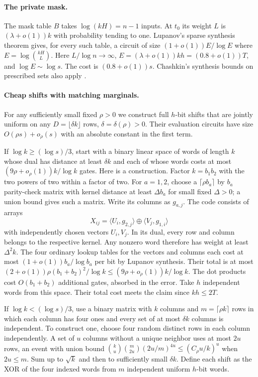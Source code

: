 \documentclass[11pt]{article}
\begin{document}
\paragraph{The private mask.}
The mask table $B$ takes $\log(kH)=n-1$ inputs. At $t_0$ its weight $L$ is $(\lambda+o(1))k$ with probability tending to one. Lupanov's sparse synthesis theorem \cite{lup,kors} gives, for every such table, a circuit of size $(1+o(1))E/\log E$ where $E=\log\binom{kH}{L}$. Here $L/\log n\to\infty$, $E=(\lambda+o(1))kh=(0.8+o(1))T$, and $\log E\sim\log s$. The cost is $(0.8+o(1))s$. Chashkin's synthesis bounds on prescribed sets also apply \cite{chash}.

\paragraph{Cheap shifts with matching marginals.}
For any sufficiently small fixed $\rho>0$ we construct full $h$-bit shifts that are jointly uniform on any $D=\lfloor\delta k\rfloor$ rows, $\delta=\delta(\rho)>0$. Their evaluation circuits have size $O(\rho s)+o_\rho(s)$ with an absolute constant in the first term.

If $\log k\ge (\log s)/3$, start with a binary linear space of words of length $k$ whose dual has distance at least $\delta k$ and each of whose words costs at most $(9\rho+o_\rho(1))k/\log k$ gates. Here is a construction. Factor $k=b_1 b_2$ with the two powers of two within a factor of two. For $a=1,2$, choose a $\lceil\rho b_a\rceil$ by $b_a$ parity-check matrix with kernel distance at least $\Delta b_a$ for small fixed $\Delta>0$; a union bound gives such a matrix. Write its columns as $g_{a,j}$. The code consists of arrays
\[
        X_{ij}=\langle U_i,g_{2,j}\rangle\oplus\langle V_j,g_{1,i}\rangle
\]
with independently chosen vectors $U_i,V_j$. In its dual, every row and column belongs to the respective kernel. Any nonzero word therefore has weight at least $\Delta^2 k$. The four ordinary lookup tables for the vectors and columns each cost at most $(1+o(1))b_a/\log b_a$ per bit by Lupanov synthesis. Their total is at most $(2+o(1))\rho (b_1+b_2)^2/\log k\le(9\rho+o_\rho(1))k/\log k$. The dot products cost $O(b_1+b_2)$ additional gates, absorbed in the error. Take $h$ independent words from this space. Their total cost meets the claim since $kh\le2T$.

If $\log k<(\log s)/3$, use a binary matrix with $k$ columns and $m=\lceil\rho k\rceil$ rows in which each column has four ones and every set of at most $\delta k$ columns is independent. To construct one, choose four random distinct rows in each column independently. A set of $u$ columns without a unique neighbor uses at most $2u$ rows, an event with union bound $\binom{k}{u}\binom{m}{2u}(2u/m)^{4u}\le(C_\rho u/k)^u$ when $2u\le m$. Sum up to $\sqrt k$ and then to sufficiently small $\delta k$. Define each shift as the XOR of the four indexed words from $m$ independent uniform $h$-bit words.
\end{document}
